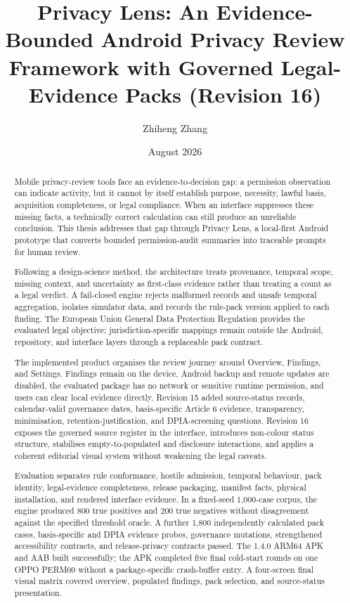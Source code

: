 \documentclass[11pt,a4paper]{article}
\title{Privacy Lens: An Evidence-Bounded Android Privacy Review Framework with Governed Legal-Evidence Packs (Revision 16)}
\author{Zhiheng Zhang}
\date{August 2026}
\begin{document}
\maketitle
\begin{abstract}
\small\singlespacing
Mobile privacy-review tools face an evidence-to-decision gap: a permission observation can indicate activity, but it cannot by itself establish purpose, necessity, lawful basis, acquisition completeness, or legal compliance. When an interface suppresses these missing facts, a technically correct calculation can still produce an unreliable conclusion. This thesis addresses that gap through Privacy Lens, a local-first Android prototype that converts bounded permission-audit summaries into traceable prompts for human review.

Following a design-science method, the architecture treats provenance, temporal scope, missing context, and uncertainty as first-class evidence rather than treating a count as a legal verdict. A fail-closed engine rejects malformed records and unsafe temporal aggregation, isolates simulator data, and records the rule-pack version applied to each finding. The European Union General Data Protection Regulation provides the evaluated legal objective; jurisdiction-specific mappings remain outside the Android, repository, and interface layers through a replaceable pack contract.

The implemented product organises the review journey around Overview, Findings, and Settings. Findings remain on the device, Android backup and remote updates are disabled, the evaluated package has no network or sensitive runtime permission, and users can clear local evidence directly. Revision 15 added source-status records, calendar-valid governance dates, basis-specific Article 6 evidence, transparency, minimisation, retention-justification, and DPIA-screening questions. Revision 16 exposes the governed source register in the interface, introduces non-colour status structure, stabilises empty-to-populated and disclosure interactions, and applies a coherent editorial visual system without weakening the legal caveats.

Evaluation separates rule conformance, hostile admission, temporal behaviour, pack identity, legal-evidence completeness, release packaging, manifest facts, physical installation, and rendered interface evidence. In a fixed-seed 1,000-case corpus, the engine produced 800 true positives and 200 true negatives without disagreement against the specified threshold oracle. A further 1,800 independently calculated pack cases, basis-specific and DPIA evidence probes, governance mutations, strengthened accessibility contracts, and release-privacy contracts passed. The 1.4.0 ARM64 APK and AAB built successfully; the APK completed five final cold-start rounds on one OPPO PERM00 without a package-specific crash-buffer entry. A four-screen final visual matrix covered overview, populated findings, pack selection, and source-status presentation.


\end{abstract}
\end{document}
